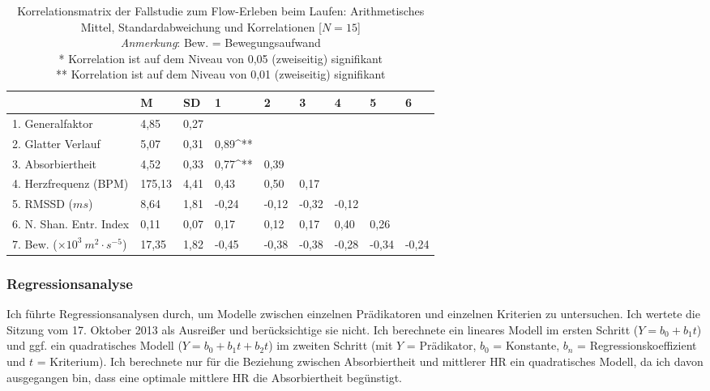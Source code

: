 \begin{sidewaystable}
\centering
	\caption[Korrelationsmatrix (Fallstudie: Laufen)]{Korrelationsmatrix der Fallstudie zum Flow-Erleben beim Laufen: Arithmetisches Mittel, Standardabweichung und Korrelationen [$N = 15$]\\ \hspace{\textwidth} \emph{Anmerkung}: Bew. = Bewegungsaufwand \\ \hspace{\textwidth}* Korrelation ist auf dem Niveau von 0,05 (zweiseitig) signifikant \\ \hspace{\textwidth}** Korrelation ist auf dem Niveau von 0,01 (zweiseitig) signifikant}
	\label{tab:korrelationen_fallstudie_laufen}
\begin{tabular}{lxxxxxxxx}
\toprule
& M & SD & 1 & 2 & 3 & 4 & 5 & 6 \\
. Generalfaktor & 4,85 & 0,27 & & & & & & \\
2. Glatter Verlauf & 5,07 & 0,31 & 0,89^{**} & & & & & \\
3. Absorbiertheit & 4,52 & 0,33 & 0,77^{**} & 0,39 & & & & \\
4. Herzfrequenz (BPM) & 175,13 & 4,41 & 0,43 & 0,50 & 0,17 & & & \\
5. RMSSD ($ms$) & 8,64 & 1,81 & -0,24 & -0,12 & -0,32 & -0,12 & & \\
6. N. Shan. Entr. Index & 0,11 & 0,07 & 0,17 & 0,12 & 0,17 & 0,40 & 0,26 & \\
7. Bew. ($\times 10^3 \: m^2 \cdot s^{-5}$) & 17,35 & 1,82 & -0,45 & -0,38 & -0,38 & -0,28 & -0,34 & -0,24 \\
\bottomrule
\bottomrule
\end{tabular}
\end{sidewaystable}

\subsubsection{Regressionsanalyse}
Ich führte Regressionsanalysen durch, um Modelle zwischen einzelnen Prädikatoren und einzelnen Kriterien zu untersuchen. Ich wertete die Sitzung vom 17. Oktober 2013 als Ausreißer und berücksichtige sie nicht. Ich berechnete ein lineares Modell im ersten Schritt ($Y = b_{0} + b_{1}t$) und ggf. ein quadratisches Modell ($Y = b_{0} + b_{1}t + b_{2}t$) im zweiten Schritt (mit $Y$ = Prädikator, $b_{0}$ = Konstante, $b_{n}$ = Regressionskoeffizient und $t$ = Kriterium). Ich berechnete nur für die Beziehung zwischen Absorbiertheit und mittlerer \ac{HR} ein quadratisches Modell, da ich davon ausgegangen bin, dass eine optimale mittlere \ac{HR} die Absorbiertheit begünstigt.


